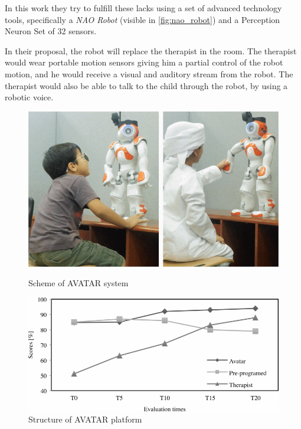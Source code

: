 \documentclass[12pt,journal,draftclsnofoot,onecolumn]{IEEEtran}
\begin{document}
In this work they try to fulfill these lacks using a set of advanced technology tools, specifically a \textit{NAO Robot} (visible in \autoref{fig:nao_robot}) and a Perception Neuron Set of 32 sensors.

In their proposal, the robot will replace the therapist in the room.
The therapist would wear portable motion sensors giving him a partial control of the robot motion, and he would receive a visual and auditory stream from the robot. The therapist would also be able to talk to the child through the robot, by using a robotic voice.

\begin{figure}[h]
\centering

\begin{minipage}{0.48\textwidth}
\centering
\includegraphics[width=\textwidth]{nao_robot.png}
\caption{Scheme of AVATAR system}
\label{fig:nao_robot}
\end{minipage}
\begin{minipage}{0.48\textwidth}
\centering
\includegraphics[width=\textwidth]{scores.png}
\caption{Structure of AVATAR platform}
\label{fig:scores}
\end{minipage}

\end{figure}
\end{document}
